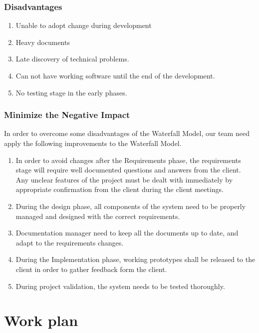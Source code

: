 \documentclass[11pt, a4paper]{report}
\begin{document}
\subsection{Disadvantages}
\begin{enumerate}
	\item  Unable to adopt change during development
	\item  Heavy documents
	\item  Late discovery of technical problems.
	\item  Can not have working software until the end of the development.
	\item  No testing stage in the early phases.

\end{enumerate}

\subsection{Minimize the Negative Impact}
In order to overcome some disadvantages of the Waterfall Model, our team need apply the following improvements to the Waterfall Model.

\begin{enumerate}
	\item  In order to avoid changes after the Requirements phase, the requirements stage will require well documented questions and answers from the client. Any unclear features of the project must be dealt 	   with immediately by appropriate confirmation from the client during the client meetings.
	\item  During the design phase, all components of the system need to be properly managed and designed with the correct requirements.
	\item  Documentation manager need to keep all the documents up to date, and adapt to the requirements changes.
	\item  During the Implementation phase, working prototypes shall be released to the client in order to gather feedback form the client.
	\item  During project validation, the system needs to be tested thoroughly.
\end{enumerate}













\chapter{Work plan}
\end{document}

